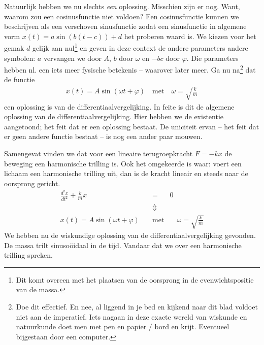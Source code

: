 \documentclass{ximera}
\begin{document}
	Natuurlijk hebben we nu slechts \emph{een} oplossing. Misschien zijn er nog. Want, waarom zou een cosinusfunctie niet voldoen? Een cosinusfunctie kunnen we beschrijven als een verschoven sinusfunctie zodat een sinusfunctie in algemene vorm $x(t)=a\sin(b(t-c))+d$ het proberen waard is. We kiezen voor het gemak $d$ gelijk aan nul\footnote{Dit komt overeen met het plaatsen van de oorsprong in de evenwichtspositie van de massa.} en geven in deze context de andere parameters andere symbolen: $a$ vervangen we door $A$, $b$ door $\omega$ en $-bc$ door $\varphi$. Die parameters hebben nl. een iets meer fysische betekenis -- waarover later meer. Ga nu na\footnote{Doe dit effectief. En nee, al liggend in je bed en kijkend naar dit blad voldoet niet aan de imperatief. Iets nagaan in deze exacte wereld van wiskunde en natuurkunde doet men met pen en papier / bord en krijt. Eventueel bijgestaan door een computer.} dat de functie 
	\begin{eqnarray*}
	x(t)=A\sin(\omega t+\varphi)\quad\mathrm{met}\quad\omega=\sqrt{\frac{k}{m}}
	\end{eqnarray*}
	een oplossing is van de differentiaalvergelijking. In feite is dit de algemene oplossing van de differentiaalvergelijking. Hier hebben we de existentie aangetoond; het feit dat er een oplossing bestaat. De uniciteit ervan -- het feit dat er geen andere functie bestaat -- is nog een ander paar mouwen.
	
	Samengevat vinden we dat voor een lineaire terugroepkracht $F=-kx$ de beweging een harmonische trilling is. Ook het omgekeerde is waar: voert een lichaam een harmonische trilling uit, dan is de kracht lineair en steeds naar de oorsprong gericht.
	\begin{eqnarray}
	\frac{d^2x}{dt^2}+\frac{k}{m}x&=&0\nonumber\\
	&\Updownarrow&\nonumber\\
	x(t)=A\sin(\omega t+\varphi)\quad&\mathrm{met}&\quad\omega=\sqrt{\frac{k}{m}}
	\end{eqnarray}
	We hebben nu de wiskundige oplossing van de differentiaalvergelijking gevonden. De massa trilt sinusoöidaal in de tijd. Vandaar dat we over een harmonische trilling spreken.
	
\end{document}

